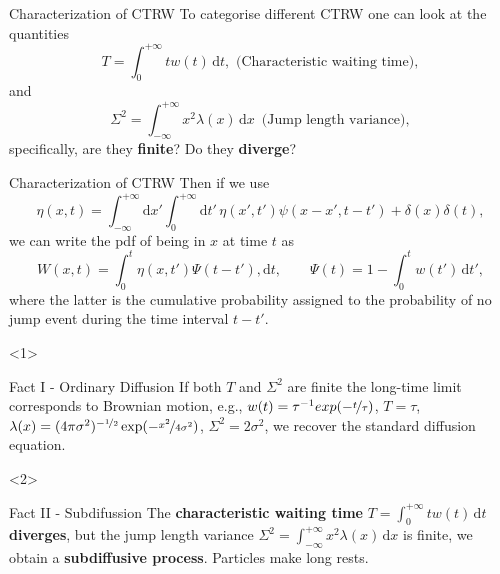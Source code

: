 \documentclass[aspectratio=169,xcolor=dvipsnames]{beamer}
\begin{document}
\begin{frame}{Characterization of CTRW}
	To categorise different CTRW one can look at the quantities
	\[
	T = \int_{0}^{+\infty} t w(t)\,\textrm{d}t, \text{ (Characteristic waiting time)},
	\]
	and 
	\[
	\Sigma^2 = \int_{-\infty}^{+\infty} x^2\lambda(x)\,\textrm{d}x\, \text{ (Jump length variance)},
	\]
	specifically, are they \textbf{finite}? Do they \textbf{diverge}?
	
	
\end{frame}

\begin{frame}{Characterization of CTRW}
	Then if we use 
	\[
	\eta(x,t) = \int_{-\infty}^{+\infty} \textrm{d}x' \int_{0}^{+\infty} \textrm{d}t'\,\eta(x',t') \psi(x-x',t-t') + \delta(x)\delta(t),
	\]
	we can write the pdf of being in $x$ at time $t$ as
	\[
	W(x,t) = \int_{0}^{t} \eta(x,t') \Psi(t-t'),\textrm{d}t, \qquad \Psi(t) = 1 - \int_{0}^{t} w(t')\,\textrm{d}t',
	\]
	where the latter is the cumulative probability assigned to the probability of \alert{no jump event} during the time interval  $t-t'$.
	\begin{onlyenv}
	\begin{alertblock}{Fact I - Ordinary Diffusion}
		If both $T$ and $\Sigma^2$ are finite the long-time limit corresponds to Brownian motion, e.g., $w(t) = \tau^{-1} exp(-\nicefrac{t}{\tau})$, $T = \tau$, $\lambda(x) = (4\pi \sigma^2)^{-\nicefrac{1}{2}} \exp(-\nicefrac{x^2}{4\sigma^2})$, $\Sigma^2 = 2 \sigma^2$, we recover the standard diffusion equation.
	\end{alertblock}
	\end{onlyenv}
	\begin{onlyenv}
	\begin{alertblock}{Fact II - Subdifussion}
		The \textbf{characteristic waiting time} $T = \int_{0}^{+\infty} t w(t)\,\textrm{d}t$ \textbf{diverges}, but the jump length variance $\Sigma^2 = \int_{-\infty}^{+\infty} x^2\lambda(x)\,\textrm{d}x$ is finite, we obtain a \textbf{subdiffusive process}. Particles make long rests.
	\end{alertblock}
	\end{onlyenv}
\end{frame}
\end{document}
